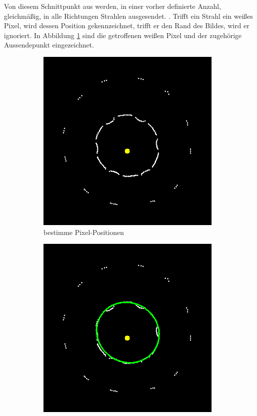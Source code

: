 Von diesem Schnittpunkt aus werden, in einer vorher definierte Anzahl, gleichmäßig, in alle Richtungen Strahlen ausgesendet. . 
Trifft ein Strahl ein weißes Pixel, wird dessen Position gekennzeichnet, trifft er den Rand des Bildes, wird er ignoriert. In Abbildung \ref{fig:rayCastWOE} sind die getroffenen weißen Pixel und der zugehörige Aussendepunkt eingezeichnet. 

\begin{figure}[!htb]
	\centering
	\begin{subfigure}{.5\textwidth}
		\centering
		\includegraphics[width=.9\textwidth]{images/rayCast0.png}
		\caption{bestimme Pixel-Positionen}
		\label{fig:rayCastWOE}
	\end{subfigure}%
	\begin{subfigure}{.5\textwidth}
		\centering
		\includegraphics[width=.9\textwidth]{images/rayCast0Ellipse.png}

\end{subfigure}
\end{figure}
